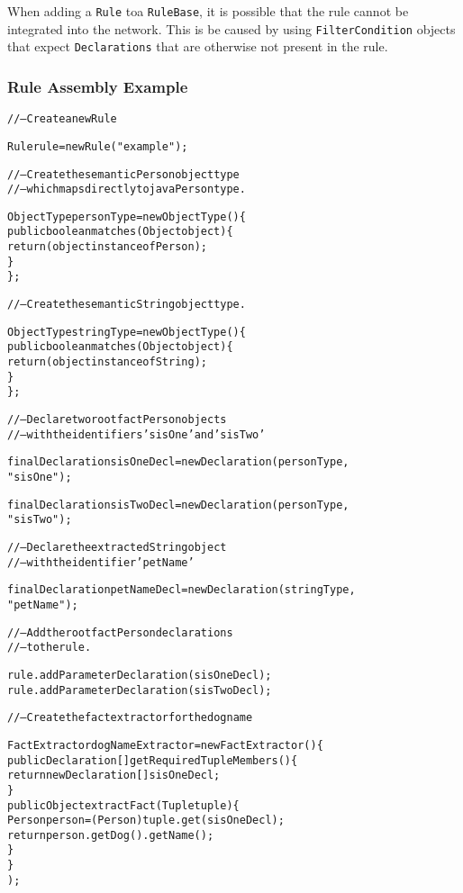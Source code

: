 When adding a \verb|Rule| toa  \verb|RuleBase|, it is possible that
the rule cannot be integrated into the network.  This is be caused
by using \verb|FilterCondition| objects that expect
\verb|Declarations| that are otherwise not present in the rule.

\newpage

\subsubsection{Rule Assembly Example}

\footnotesize
\begin{alltt}
// -- Create a new Rule

Rule rule = new Rule("example");

// -- Create the semantic Person object type
// -- which maps directly to java Person type.

ObjectType personType = new ObjectType() \{
        public boolean matches(Object object) \{ 
            return ( object instanceof Person );
        \}
    \};

// -- Create the semantic String object type.

ObjectType stringType = new ObjectType() \{
        public boolean matches(Object object) \{ 
            return ( object instanceof String );
        \}
    \};

// -- Declare two root fact Person objects 
// -- with the identifiers 'sisOne' and 'sisTwo'

final Declaration sisOneDecl = new Declaration( personType,
                                                "sisOne" );

final Declaration sisTwoDecl = new Declaration( personType,
                                                "sisTwo" );

// -- Declare the extracted String object
// -- with the identifier 'petName'

final Declaration petNameDecl = new Declaration( stringType,
                                                 "petName" );

// -- Add the root fact Person declarations
// -- to the rule.

rule.addParameterDeclaration( sisOneDecl );
rule.addParameterDeclaration( sisTwoDecl );


// -- Create the fact extractor for the dog name

FactExtractor dogNameExtractor = new FactExtractor() \{
        public Declaration[] getRequiredTupleMembers() \{
            return new Declaration[] { sisOneDecl };
        \}
        public Object extractFact(Tuple tuple) \{
            Person person = (Person) tuple.get( sisOneDecl );
            return person.getDog().getName();
        \}
    \}
      );


\end{alltt}

